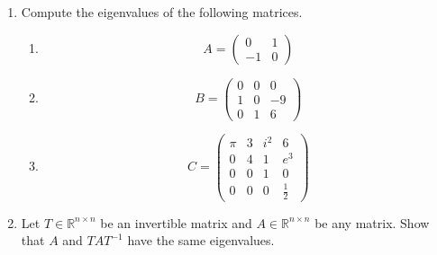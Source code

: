 \vspace*{-0.5cm}
\begin{enumerate}
		\item Compute the eigenvalues of the following matrices. %
	\begin{enumerate}
		\item $$
		A = \begin{pmatrix}
		0&1\\
		-1&0
		\end{pmatrix}
		$$
		\item
		$$
		B = \begin{pmatrix}
		0&0&0\\
		1&0&-9\\
		0&1&6
		\end{pmatrix}
		$$
		\item $$
		C = \begin{pmatrix}
		\pi& 3& i^2& 6\\
		0 & 4& 1  & e^3\\
		0 & 0& 1  & 0\\
		0 & 0& 0  & \frac{1}{2}
		\end{pmatrix}
		$$
	\end{enumerate}
	 \item Let $T \in \mathbb{R}^{n \times n}$ be an invertible matrix and $A \in \mathbb{R}^{n \times n}$ be any matrix. Show that $A$ and $T A T^{-1}$ have the same eigenvalues.
\end{enumerate}
 